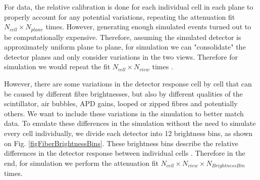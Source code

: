 For data, the relative calibration is done for each individual cell in each plane to properly account for any potential variations, repeating the attenuation fit $N_{cell}\times N_{plane}$ times. However, generating enough simulated events turned out to be computationally expensive. Therefore, assuming the simulated detector is approximately uniform plane to plane, for simulation we can "consolidate" the detector planes and only consider variations in the two views. Therefore for simulation we would repeat the fit $N_{cell}\times N_{view}$ times \cite{NOVA-doc-13579-SAAttenuationAndThreshold,NOVA-doc-34909}.

However, there are some variations in the detector response cell by cell that can be caused by different fibre brightnesses, but also by different qualities of the scintillator, air bubbles, APD gains, looped or zipped fibres and potentially others. We want to include these variations in the simulation to better match data. To emulate these differences in the simulation without the need to simulate every cell individually, we divide each detector into 12 brightness bins, as shown on Fig. \ref{figFiberBrightnessBins}. These brightness bins describe the relative differences in the detector response between individual cells \cite{NOVA-doc-34909}. Therefore in the end, for simulation we perform the attenuation fit $N_{cell}\times N_{view}\times N_{BrightnessBin}$ times.


